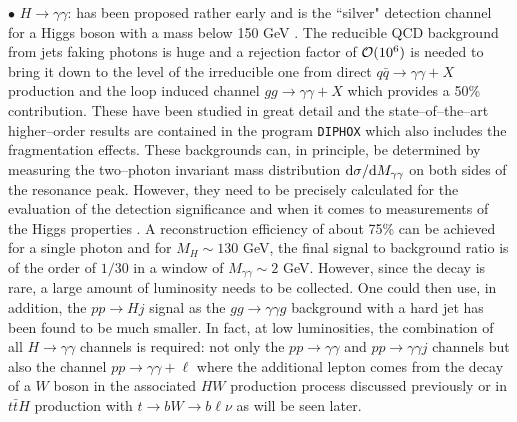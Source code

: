 $\bullet$ \underline{$H \to \gamma \gamma$}: has been proposed rather early
\cite{pp-Galison,pp-Wudka} and is the ``silver" detection channel for a Higgs
boson with a mass below 150 GeV \cite{pp-Haa}.  The reducible QCD background
from jets faking photons is huge and a rejection factor of ${\cal O}(10^6)$ is
needed to bring it down to the level of the irreducible one from direct $q\bar
q \to \gamma \gamma +X$ production and the loop induced channel $gg\to\gamma
\gamma+X$ which provides a 50\% contribution.  These have been studied in great
detail \cite{pp-Haa-bckg1} and the state--of--the--art higher--order results
are contained in the program {\tt DIPHOX} \cite{Diphox} which also includes the
fragmentation effects. These backgrounds can, in principle, be determined by
measuring the two--photon invariant mass distribution ${\rm d}\sigma/ {\rm d}
M_{\gamma \gamma}$ on both sides of the resonance peak. However, they need to
be precisely calculated for the evaluation of the detection significance and
when it comes to measurements of the Higgs properties \cite{Zepp-HC01}.  A
reconstruction efficiency of about 75\% can be achieved for a single photon and
for $M_H \sim 130$ GeV, the final signal to background ratio is of the order of
$1/30$ in a window of $M_{\gamma \gamma}\sim 2$ GeV. However, since the decay
is rare, a large amount of luminosity needs to be collected. One could then
use, in addition, the $pp \to Hj$ signal \cite{ggHp-dubinin} as the $gg \to
\gamma \gamma g$ background with a hard jet has been found to be much smaller.
In fact, at low luminosities, the combination of all $H \to \gamma \gamma$
channels is required: not only the $pp \to \gamma \gamma$ and $pp \to \gamma
\gamma j$ channels but also the channel $pp \to \gamma\gamma +\ell$ where the
additional lepton comes from the decay of a $W$ boson in the associated $HW$
production process discussed previously or in $t\bar t H$ production with $t
\to bW \to b\ell \nu$ as will be seen later.\s


